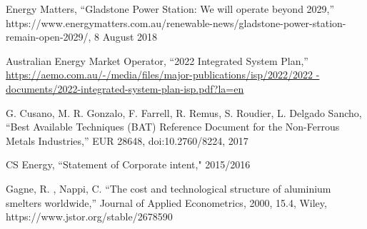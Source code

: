 \documentclass[12pt,a4paper]{article}
\begin{document}
\begin{thebibliography}{1}
 Energy Matters, “Gladstone Power Station: We will operate
  beyond 2029,”
  https://www.energymatters.com.au/renewable-news/gladstone-power-station-remain-open-2029/,
  8 August 2018

 Australian Energy Market Operator, “2022 Integrated System
  Plan,”
    \url{https://aemo.com.au/-/media/files/major-publications/isp/2022/2022
    -documents/2022-integrated-system-plan-isp.pdf?la=en}

 G. Cusano, M. R. Gonzalo, F. Farrell, R. Remus, S. Roudier, L.
  Delgado Sancho,   “Best Available Techniques (BAT) Reference Document for the
    Non-Ferrous Metals Industries,” EUR 28648, doi:10.2760/8224, 2017

  CS Energy, ``Statement of Corporate intent," 2015/2016

  Gagne, R. , Nappi, C.  ``The cost and technological structure of aluminium
    smelters worldwide,'' Journal of Applied Econometrics, 2000, 15.4, Wiley,
    https://www.jstor.org/stable/2678590


  

\end{thebibliography}
\end{document}
